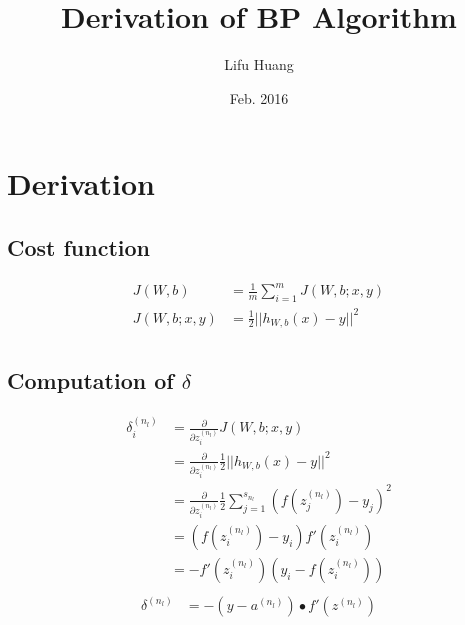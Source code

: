 \documentclass{article}
\title{Derivation of BP Algorithm}
\author{Lifu Huang}
\date{Feb. 2016}
\begin{document}
	\maketitle
	\section{Derivation}
	\subsection{Cost function}
	\begin{equation}
		\begin{aligned}
			J(W, b) &= \frac{1}{m} \sum_{i=1}^{m} J(W, b; x, y)\\
			J(W, b; x, y) &= \frac{1}{2} ||h_{W,b}(x) - y||^2\\
		\end {aligned}
	\end{equation}
	\subsection{Computation of $\delta$}
	\begin{equation}
		\begin{aligned}
			\delta_i^{(n_l)} &= \frac{\partial}{\partial z_i^{(n_l)}} J(W, b; x, y) \\
			&= \frac{\partial}{\partial z_i^{(n_l)}} \frac{1}{2} ||h_{W,b}(x) - y||^2\\
			&= \frac{\partial}{\partial z_i^{(n_l)}} \frac{1}{2} \sum_{j=1}^{s_{n_l}} (f(z_j^{(n_l)}) - y_j)^2 \\
			&= (f(z_i^{(n_l)}) - y_i) f'(z_i^{(n_l)}) \\
			&= -f'(z_i^{(n_l)}) (y_i - f(z_i^{(n_l)})) \\
		\end{aligned}
	\end{equation}
	\begin{equation}
		\begin{aligned}
			\delta^{(n_l)} &= - (y - a^{(n_l)}) \bullet f'(z^{(n_l)}) 
		\end{aligned}
	\end{equation}
\end{document}
